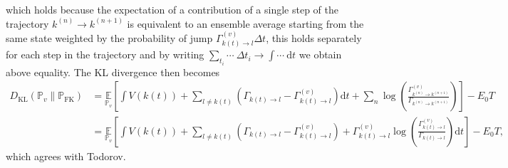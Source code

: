 which holds because the expectation of a contribution of a single step of the trajectory $k^{(n)} \rightarrow k^{(n+1)}$ is equivalent to an ensemble average starting from the same state weighted by the probability of jump $\Gamma_{k(t) \rightarrow l}^{(v)} \Delta t$, this holds separately for each step in the trajectory and by writing $\sum_{t_i} \cdots~\Delta t_i \rightarrow \int \cdots~\mathrm{d}t$ we obtain above equality. The KL divergence then becomes
\begin{equation}
	\begin{aligned}
		D_{\mathrm{KL}}\left(\mathbb{P}_{v} \| \mathbb{P}_{\mathrm{FK}}\right) &= 
		\underset{\mathbb{P}_{v}}{\mathbb{E}}\left[\int V(k(t))+\sum_{l \neq k(t)}\left(\Gamma_{k(t) \rightarrow l}-\Gamma_{k(t) \rightarrow l}^{(v)}\right) \mathrm{d} t+\sum_{n} \log \left(\frac{\Gamma_{k^{(n)} \rightarrow k^{(n+1)}}^{(v)}}{\Gamma_{k^{(n)} \rightarrow k^{(n+1)}}}\right)\right]-E_{0} T \\
		&= \underset{\mathbb{P}_{v}}{\mathbb{E}}\left[\int V(k(t))+\sum_{l \neq k(t)}\left(\Gamma_{k(t) \rightarrow l}-\Gamma_{k(t) \rightarrow l}^{(v)}\right)+\Gamma_{k(t) \rightarrow l}^{(v)} \log \left(\frac{\Gamma_{k(t) \rightarrow l}^{(v)}}{\Gamma_{k(t) \rightarrow l}}\right) \mathrm{d} t\right]-E_{0} T,
	\end{aligned}
\end{equation}
which agrees with Todorov.